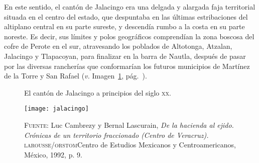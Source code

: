 \documentclass[14pt,twoside,final]{extbook} %
\begin{document}
En este sentido, el cantón de Jalacingo era una delgada y alargada faja territorial situada en el centro del estado, que despuntaba en las últimas estribaciones del altiplano central en su parte sureste, y descendía rumbo a la costa en su parte noreste. Es decir, sus límites y polos geográficos comprendían la zona boscosa del cofre de Perote en el sur, atravesando los poblados de Altotonga, Atzalan, Jalacingo y Tlapacoyan, para finalizar en la barra de Nautla, después de pasar por las diversas rancherías que conformarían los futuros municipios de Martínez de la Torre y San Rafael (\emph{v.} Imagen~\ref{fig:jalacingo-principios-xx}, pág.~\pageref{fig:jalacingo-principios-xx}).\enlargethispage{\baselineskip}
\begin{figure}
\caption[El cantón de Jalacingo a principios del siglo \textsc{xx}]{El cantón de Jalacingo a principios del siglo \textsc{xx}.}
\texttt{[image: jalacingo]}
\caption*{\textsc{Fuente:} Luc Cambrezy y Bernal Lascurain, \emph{De la hacienda al ejido. Crónicas de un territorio fraccionado (Centro de Veracruz).} \textsc{larousse/orstom} Centro de Estudios Mexicanos y Centroamericanos, México, 1992, p. 9.}
\label{fig:jalacingo-principios-xx}
\end{figure}
\end{document}
